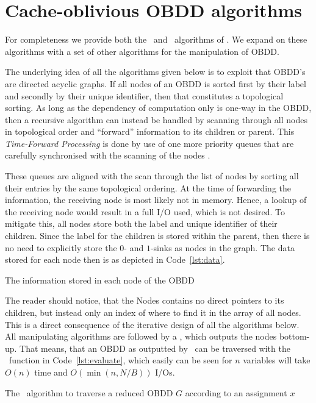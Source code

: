 \newpage
\section{Cache-oblivious OBDD algorithms} \label{sec:theory}

For completeness we provide both the \Reduce\ and \Apply\ algorithms of
\cite{Arge96}. We expand on these algorithms with a set of other algorithms for
the manipulation of OBDD.

The underlying idea of all the algorithms given below is to exploit that OBDD's
are directed acyclic graphs. If all nodes of an OBDD is sorted first by their
label and secondly by their unique identifier, then that constitutes a
topological sorting. As long as the dependency of computation only is one-way in
the OBDD, then a recursive algorithm can instead be handled by scanning through
all nodes in topological order and ``forward'' information to its children or
parent. This \emph{Time-Forward Processing} is done by use of one more priority
queues that are carefully synchronised with the scanning of the nodes \todocite.

These queues are aligned with the scan through the list of nodes by sorting all
their entries by the same topological ordering. At the time of forwarding the
information, the receiving node is most likely not in memory. Hence, a lookup of
the receiving node would result in a full I/O used, which is not desired. To
mitigate this, all nodes store both the label and unique identifier of their
children. Since the label for the children is stored within the parent, then
there is no need to explicitly store the $0$- and $1$-sinks as nodes in the
graph. The data stored for each node then is as depicted in Code~\ref{lst:data}.
\begin{lstfloat}[ht!]
  \centering

  

  \caption{The information stored in each node of the OBDD}
  \label{lst:data}
\end{lstfloat}

The reader should notice, that the Nodes contains no direct pointers to its
children, but instead only an index of where to find it in the array of all
nodes. This is a direct consequence of the iterative design of all the
algorithms below. All manipulating algorithms are followed by a \Reduce, which
outputs the nodes bottom-up. That means, that an OBDD as outputted by \Reduce\
can be traversed with the \Evaluate\ function in Code~\ref{lst:evaluate}, which
easily can be seen for $n$ variables will take $O(n)$ time and $O(\min(n, N/B))$
I/Os.
\begin{lstfloat}[ht!]
  \centering

  

  \caption{The \Evaluate\ algorithm to traverse a reduced OBDD $G$ according to an
    assignment $x$}
  \label{lst:evaluate}
\end{lstfloat}

